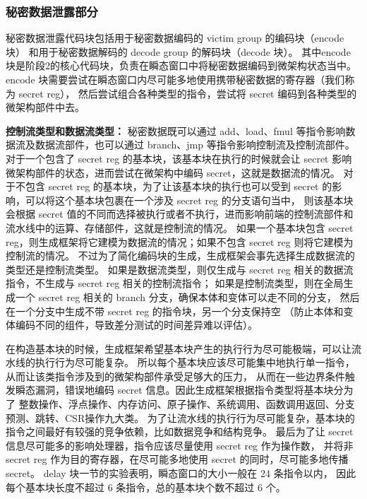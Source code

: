 \subsubsection{秘密数据泄露部分}

秘密数据泄露代码块包括用于秘密数据编码的 victim group 的编码块（encode 块）
和用于秘密数据解码的 decode group 的解码块（decode 块）。
其中encode 块是阶段2的核心代码块，负责在瞬态窗口中将秘密数据编码到微架构状态当中。
encode 块需要尝试在瞬态窗口内尽可能多地使用携带秘密数据的寄存器（我们称为 secret reg），
然后尝试组合各种类型的指令，尝试将 secret 编码到各种类型的微架构部件中去。\par

\textbf{控制流类型和数据流类型：}
秘密数据既可以通过 add、load、fmul 等指令影响数据流及数据流部件，也可以通过 branch、jmp 等指令影响控制流及控制流部件。
对于一个包含了 secret reg 的基本块，该基本块在执行的时候就会让 secret 影响微架构部件的状态，进而尝试在微架构中编码 secret，这就是数据流的情况。
对于不包含 secret reg 的基本块，为了让该基本块的执行也可以受到 secret 的影响，可以将这个基本块包裹在一个涉及 secret reg 的分支语句当中，
则该基本块会根据 secret 值的不同而选择被执行或者不执行，进而影响前端的控制流部件和流水线中的运算、存储部件，这就是控制流的情况。
如果一个基本块包含 secret reg，则生成框架将它建模为数据流的情况；如果不包含 secret reg 则将它建模为控制流的情况。
不过为了简化编码块的生成，生成框架会事先选择生成数据流的类型还是控制流类型。
如果是数据流类型，则仅生成与 secret reg 相关的数据流指令，不生成与 secret reg 相关的控制流指令；
如果是控制流类型，则在全局生成一个 secret reg 相关的 branch 分支，确保本体和变体可以走不同的分支，
然后在一个分支中生成不带 secret reg 的指令块，另一个分支保持空
（防止本体和变体编码不同的组件，导致差分测试的时间差异难以评估）。\par

在构造基本块的时候，生成框架希望基本块产生的执行行为尽可能极端，可以让流水线的执行行为尽可能复杂。
所以每个基本块应该尽可能集中地执行单一指令，从而让该类指令涉及到的微架构部件承受足够大的压力，
从而在一些边界条件触发瞬态漏洞，错误地编码 secret 信息。因此生成框架根据指令类型将基本块分为了
整数操作、浮点操作、内存访问、原子操作、系统调用、函数调用返回、分支预测、跳转、CSR操作九大类。
为了让流水线的执行行为尽可能复杂，基本块的指令之间最好有较强的竞争依赖，比如数据竞争和结构竞争。
最后为了让 secret 信息尽可能多的影响处理器，指令应该尽量使用 secret reg 作为操作数，
并将非 secret reg 作为目的寄存器，在尽可能多地使用 secret 的同时，尽可能多地传播 secret。
delay 块一节的实验表明，瞬态窗口的大小一般在 24 条指令以内，
因此每个基本块长度不超过 6 条指令，总的基本块个数不超过 6 个。\par

